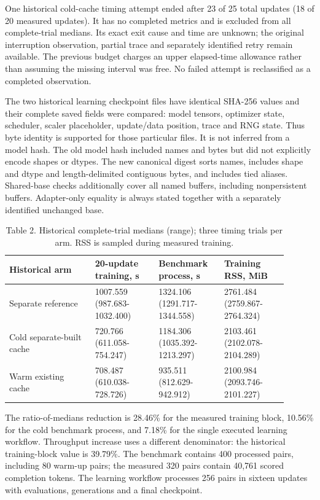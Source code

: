 \documentclass[10pt]{article}
\begin{document}
One historical cold-cache timing attempt ended after 23 of 25 total updates (18 of 20 measured updates). It has no completed metrics and is excluded from all complete-trial medians. Its exact exit cause and time are unknown; the original interruption observation, partial trace and separately identified retry remain available. The previous budget charges an upper elapsed-time allowance rather than assuming the missing interval was free. No failed attempt is reclassified as a completed observation.


The two historical learning checkpoint files have identical SHA-256 values and their complete saved fields were compared: model tensors, optimizer state, scheduler, scaler placeholder, update/data position, trace and RNG state. Thus byte identity is supported for those particular files. It is not inferred from a model hash. The old model hash included names and bytes but did not explicitly encode shapes or dtypes. The new canonical digest sorts names, includes shape and dtype and length-delimited contiguous bytes, and includes tied aliases. Shared-base checks additionally cover all named buffers, including nonpersistent buffers. Adapter-only equality is always stated together with a separately identified unchanged base.


\begin{table}[htbp]\centering\footnotesize\caption{Table 2. Historical complete-trial medians (range); three timing trials per arm. RSS is sampled during measured training.}
\begin{tabular}{p{0.279\linewidth}p{0.207\linewidth}p{0.207\linewidth}p{0.207\linewidth}}
\toprule
Historical arm & 20-update training, s & Benchmark process, s & Training RSS, MiB \\ \midrule
Separate reference & 1007.559 (987.683-1032.400) & 1324.106 (1291.717-1344.558) & 2761.484 (2759.867-2764.324) \\
Cold separate-built cache & 720.766 (611.058-754.247) & 1184.306 (1035.392-1213.297) & 2103.461 (2102.078-2104.289) \\
Warm existing cache & 708.487 (610.038-728.726) & 935.511 (812.629-942.912) & 2100.984 (2093.746-2101.227) \\
\bottomrule\end{tabular}\end{table}

The ratio-of-medians reduction is 28.46\% for the measured training block, 10.56\% for the cold benchmark process, and 7.18\% for the single executed learning workflow. Throughput increase uses a different denominator: the historical training-block value is 39.79\%. The benchmark contains 400 processed pairs, including 80 warm-up pairs; the measured 320 pairs contain 40,761 scored completion tokens. The learning workflow processes 256 pairs in sixteen updates with evaluations, generations and a final checkpoint.
\end{document}
